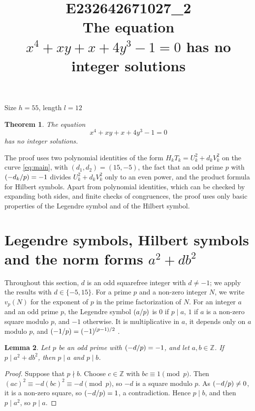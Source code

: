\documentclass[11pt]{article}
\title{\textbf{E232642671027\_2}\\[4pt] {\Large The equation $x^{4}+xy+x+4y^{3}-1=0$ has no integer solutions}}
\author{}
\date{}
\newtheorem{theorem}{Theorem}
\newtheorem{lemma}[theorem]{Lemma}
\newcommand{\Z}{\mathbb{Z}}
\newcommand{\leg}[2]{\mathchoice{\biggl(\dfrac{#1}{#2}\biggr)}{(#1/#2)}{(#1/#2)}{(#1/#2)}}
\begin{document}
\maketitle
\vspace{-8ex}
\begin{center}
Size $h=55$, length $l=12$
\end{center}

\begin{theorem}\label{thm:main}
The equation
\begin{equation}\label{eq:main}
x^{4}+xy+x+4y^{3}-1=0
\end{equation}
has no integer solutions.
\end{theorem}

The proof uses two polynomial identities of the form $H_kT_k=U_k^2+d_kV_k^2$ on the curve \eqref{eq:main}, with $(d_{1},d_{2})=(15,-5)$, the fact that an odd prime $p$ with $\leg{-d_k}{p}=-1$ divides $U_k^2+d_kV_k^2$ only to an even power, and the product formula for Hilbert symbols. Apart from polynomial identities, which can be checked by expanding both sides, and finite checks of congruences, the proof uses only basic properties of the Legendre symbol and of the Hilbert symbol.

\section{Legendre symbols, Hilbert symbols and the norm forms $a^2+db^2$}

Throughout this section, $d$ is an odd squarefree integer with $d\neq-1$; we apply the results with $d\in\{-5,15\}$. For a prime $p$ and a non-zero integer $N$, we write $v_p(N)$ for the exponent of $p$ in the prime factorization of $N$. For an integer $a$ and an odd prime $p$, the Legendre symbol $\leg{a}{p}$ is $0$ if $p\mid a$, $1$ if $a$ is a non-zero square modulo $p$, and $-1$ otherwise. It is multiplicative in $a$, it depends only on $a$ modulo $p$, and $\leg{-1}{p}=(-1)^{(p-1)/2}$ \cite[Chapter~5]{IR}.

\begin{lemma}\label{lem:divides}
Let $p$ be an odd prime with $\leg{-d}{p}=-1$, and let $a,b\in\Z$. If $p\mid a^2+db^2$, then $p\mid a$ and $p\mid b$.
\end{lemma}

\begin{proof}
Suppose that $p\nmid b$. Choose $c\in\Z$ with $bc\equiv1\pmod p$. Then $(ac)^2\equiv-d(bc)^2\equiv-d\pmod p$, so $-d$ is a square modulo $p$. As $\leg{-d}{p}\neq0$, it is a non-zero square, so $\leg{-d}{p}=1$, a contradiction. Hence $p\mid b$, and then $p\mid a^2$, so $p\mid a$.
\end{proof}
\end{document}
